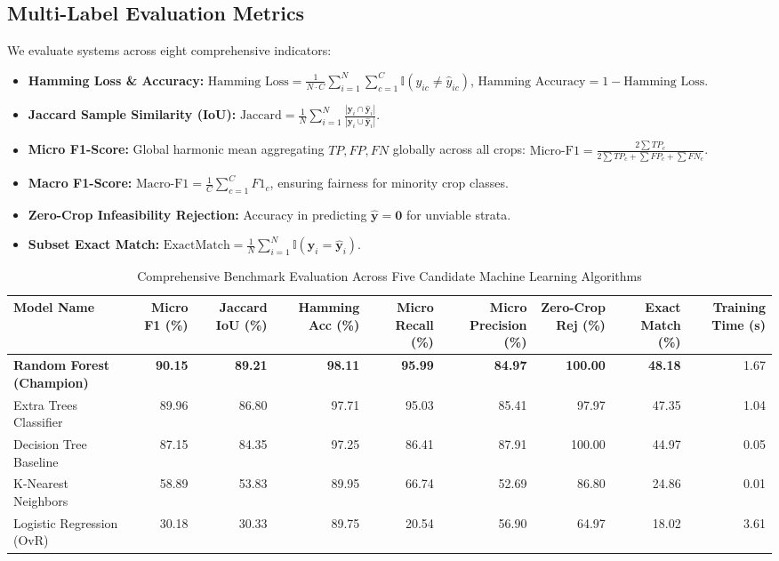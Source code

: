 \documentclass[conference]{IEEEtran}
\begin{document}
\subsection{Multi-Label Evaluation Metrics}
We evaluate systems across eight comprehensive indicators:
\begin{itemize}
    \item \textbf{Hamming Loss \& Accuracy:} $\text{Hamming Loss} = \frac{1}{N \cdot C} \sum_{i=1}^N \sum_{c=1}^C \mathbb{I}(y_{ic} \neq \hat{y}_{ic})$, $\text{Hamming Accuracy} = 1 - \text{Hamming Loss}$.
    \item \textbf{Jaccard Sample Similarity (IoU):} $\text{Jaccard} = \frac{1}{N} \sum_{i=1}^N \frac{|\mathbf{y}_i \cap \hat{\mathbf{y}}_i|}{|\mathbf{y}_i \cup \hat{\mathbf{y}}_i|}$.
    \item \textbf{Micro F1-Score:} Global harmonic mean aggregating $TP, FP, FN$ globally across all crops: $\text{Micro-F1} = \frac{2 \sum TP_c}{2 \sum TP_c + \sum FP_c + \sum FN_c}$.
    \item \textbf{Macro F1-Score:} $\text{Macro-F1} = \frac{1}{C} \sum_{c=1}^C F1_c$, ensuring fairness for minority crop classes.
    \item \textbf{Zero-Crop Infeasibility Rejection:} Accuracy in predicting $\hat{\mathbf{y}} = \mathbf{0}$ for unviable strata.
    \item \textbf{Subset Exact Match:} $\text{ExactMatch} = \frac{1}{N} \sum_{i=1}^N \mathbb{I}(\mathbf{y}_i = \hat{\mathbf{y}}_i)$.
\end{itemize}

\begin{table}[t]
\centering
\caption{Comprehensive Benchmark Evaluation Across Five Candidate Machine Learning Algorithms}
\label{tab:model_benchmark}
\begin{tabular}{lrrrrrrrr}
\toprule
\textbf{Model Name} & \textbf{Micro F1 (\%)} & \textbf{Jaccard IoU (\%)} & \textbf{Hamming Acc (\%)} & \textbf{Micro Recall (\%)} & \textbf{Micro Precision (\%)} & \textbf{Zero-Crop Rej (\%)} & \textbf{Exact Match (\%)} & \textbf{Training Time (s)} \\
\midrule
\textbf{Random Forest (Champion)} & \textbf{90.15} & \textbf{89.21} & \textbf{98.11} & \textbf{95.99} & \textbf{84.97} & \textbf{100.00} & \textbf{48.18} & 1.67 \\
Extra Trees Classifier & 89.96 & 86.80 & 97.71 & 95.03 & 85.41 & 97.97 & 47.35 & 1.04 \\
Decision Tree Baseline & 87.15 & 84.35 & 97.25 & 86.41 & 87.91 & 100.00 & 44.97 & 0.05 \\
K-Nearest Neighbors & 58.89 & 53.83 & 89.95 & 66.74 & 52.69 & 86.80 & 24.86 & 0.01 \\
Logistic Regression (OvR) & 30.18 & 30.33 & 89.75 & 20.54 & 56.90 & 64.97 & 18.02 & 3.61 \\
\bottomrule
\end{tabular}
\end{table}
\end{document}
